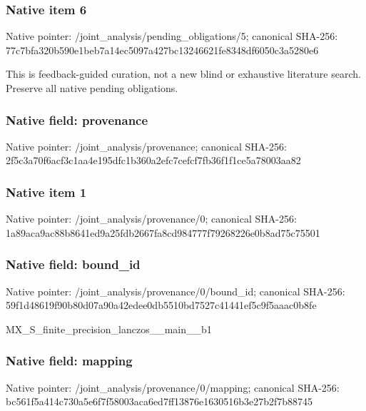 \documentclass[10pt,a4paper]{article}
\begin{document}
\subsubsection{Native item 6}
Native pointer: /joint\_\allowbreak{}analysis/pending\_\allowbreak{}obligations/5; canonical SHA-256: 77c7bfa320b590e1beb7a14ec5097a427bc13246621fe8348df6050c3a5280e6

\begingroup\raggedright\sloppy This is feedback-guided curation,\allowbreak{} not a new blind or exhaustive literature search. Preserve all native pending obligations.\par\endgroup

\subsubsection{Native field: provenance}
Native pointer: /joint\_\allowbreak{}analysis/provenance; canonical SHA-256: 2f5c3a70f6acf3c1aa4e195dfc1b360a2efc7cefcf7fb36f1f1ce5a78003aa82

\subsubsection{Native item 1}
Native pointer: /joint\_\allowbreak{}analysis/provenance/0; canonical SHA-256: 1a89aca9ac88b8641ed9a25fdb2667fa8cd984777f79268226e0b8ad75c75501

\subsubsection{Native field: bound\_\allowbreak{}id}
Native pointer: /joint\_\allowbreak{}analysis/provenance/0/bound\_\allowbreak{}id; canonical SHA-256: 59f1d48619f90b80d07a90a42edee0db5510bd7527c41441ef5c9f5aaac0b8fe

\begingroup\raggedright\sloppy MX\_\allowbreak{}S\_\allowbreak{}finite\_\allowbreak{}precision\_\allowbreak{}lanczos\_\allowbreak{}\_\allowbreak{}main\_\allowbreak{}\_\allowbreak{}b1\par\endgroup

\subsubsection{Native field: mapping}
Native pointer: /joint\_\allowbreak{}analysis/provenance/0/mapping; canonical SHA-256: bc561f5a414c730a5e6f7f58003aca6ed7ff13876e1630516b3e27b2f7b88745
\end{document}

